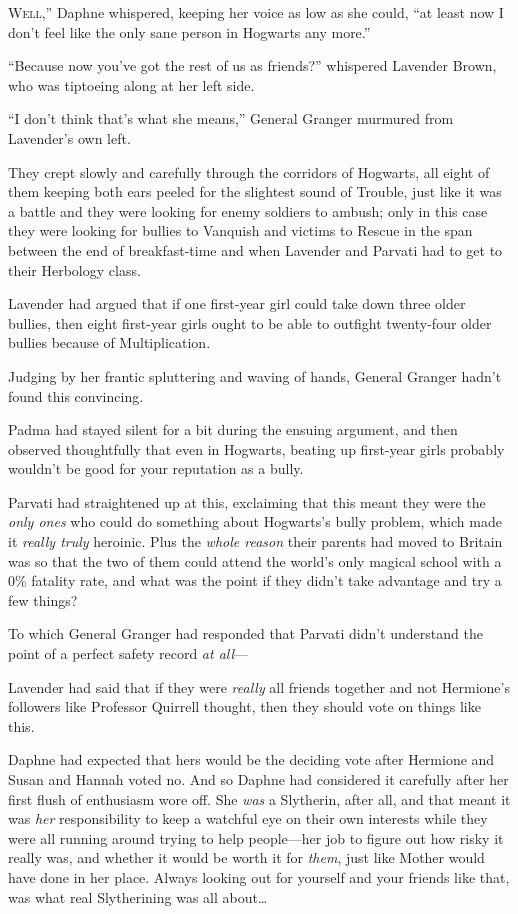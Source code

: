 
\lettrine[ante=“]{W}{ell},” Daphne whispered, keeping her voice as low as she could, “at least now I don’t feel like the only sane person in Hogwarts any more.”

“Because now you’ve got the rest of us as friends?” whispered Lavender Brown, who was tiptoeing along at her left side.

“I don’t think that’s what she means,” General Granger murmured from Lavender’s own left.

They crept slowly and carefully through the corridors of Hogwarts, all eight of them keeping both ears peeled for the slightest sound of Trouble, just like it was a battle and they were looking for enemy soldiers to ambush; only in this case they were looking for bullies to Vanquish and victims to Rescue in the span between the end of breakfast-time and when Lavender and Parvati had to get to their Herbology class.

Lavender had argued that if one first-year girl could take down three older bullies, then eight first-year girls ought to be able to outfight twenty-four older bullies because of Multiplication.

Judging by her frantic spluttering and waving of hands, General Granger hadn’t found this convincing.

Padma had stayed silent for a bit during the ensuing argument, and then observed thoughtfully that even in Hogwarts, beating up first-year girls probably wouldn’t be good for your reputation as a bully.

Parvati had straightened up at this, exclaiming that this meant they were the \emph{only ones} who could do something about Hogwarts’s bully problem, which made it \emph{really truly} heroinic. Plus the \emph{whole reason} their parents had moved to Britain was so that the two of them could attend the world’s only magical school with a 0\% fatality rate, and what was the point if they didn’t take advantage and try a few things?

To which General Granger had responded that Parvati didn’t understand the point of a perfect safety record \emph{at all}—

Lavender had said that if they were \emph{really} all friends together and not Hermione’s followers like Professor Quirrell thought, then they should vote on things like this.

Daphne had expected that hers would be the deciding vote after Hermione and Susan and Hannah voted no. And so Daphne had considered it carefully after her first flush of enthusiasm wore off. She \emph{was} a Slytherin, after all, and that meant it was \emph{her} responsibility to keep a watchful eye on their own interests while they were all running around trying to help people—her job to figure out how risky it really was, and whether it would be worth it for \emph{them}, just like Mother would have done in her place. Always looking out for yourself and your friends like that, was what real Slytherining was all about…

